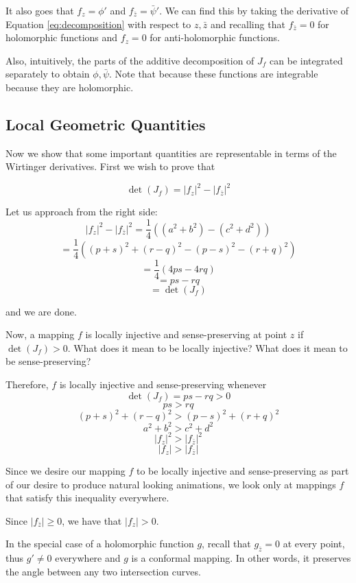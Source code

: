 It also goes that $f_z = \phi'$ and $f_{\bar{z}} = \bar{\psi}'$. We can find this by taking the derivative of Equation \ref{eq:decomposition} with respect to $z, \bar{z}$ and recalling that $f_{\bar{z}} = 0$ for holomorphic functions and $f_{z} = 0$ for anti-holomorphic functions.

Also, intuitively, the parts of the additive decomposition of $J_f$ can be integrated separately to obtain $\phi, \bar{\psi}$. Note that because these functions are integrable because they are holomorphic. 

\subsection{Local Geometric Quantities}

Now we show that some important quantities are representable in terms of the Wirtinger derivatives. First we wish to prove that

$$\det(J_f) = |f_z|^2 - |f_{\bar{z}}|^2$$

Let us approach from the right side:
$$|f_z|^2 - |f_{\bar{z}}|^2 = \frac{1}{4}\left((a^2 + b^2) - (c^2 + d^2)\right)$$
$$ = \frac{1}{4} \left( (p+s)^2 + (r-q)^2 - (p-s)^2 - (r+q)^2 \right) $$
$$ = \frac{1}{4} \left(4ps - 4rq\right) $$
$$ = ps - rq$$
$$ = \det(J_f)$$

and we are done.


Now, a mapping $f$ is locally injective and sense-preserving at point $z$ if $\det(J_f) > 0$. What does it mean to be locally injective? What does it mean to be sense-preserving?

Therefore, $f$ is locally injective and sense-preserving whenever 
$$\det(J_f) = ps - rq > 0$$
$$ps > rq$$
$$(p+s)^2 + (r-q)^2 > (p-s)^2 + (r+q)^2$$
$$a^2 + b^2 > c^2 + d^2$$
$$|f_z|^2 > |f_{\bar{z}}|^2$$
$$|f_z| > |f_{\bar{z}}|$$


Since we desire our mapping $f$ to be locally injective and sense-preserving as part of our desire to produce natural looking animations, we look only at mappings $f$ that satisfy this inequality everywhere. 

Since $|f_{\bar{z}}| \geq 0$, we have that $|f_z| > 0$. 

In the special case of a holomorphic function $g$, recall that $g_{\bar{z}} = 0$ at every point, thus $g' \neq 0$ everywhere and $g$ is a conformal mapping. In other words, it preserves the angle between any two intersection curves. %

